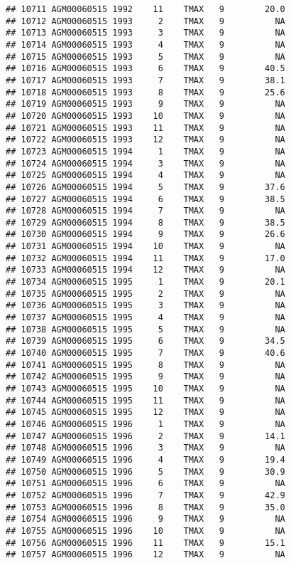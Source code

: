 \documentclass{article}\usepackage[]{graphicx}\usepackage[]{color}
\makeatletter
\newenvironment{kframe}{%
 \def\at@end@of@kframe{}%
 \ifinner\ifhmode%
  \def\at@end@of@kframe{\end{minipage}}%
  \begin{minipage}{\columnwidth}%
 \fi\fi%
 \def\FrameCommand##1{\hskip\@totalleftmargin \hskip-\fboxsep
 \colorbox{shadecolor}{##1}\hskip-\fboxsep
     \hskip-\linewidth \hskip-\@totalleftmargin \hskip\columnwidth}%
 \MakeFramed {\advance\hsize-\width
   \@totalleftmargin\z@ \linewidth\hsize
   \@setminipage}}%
 {\par\unskip\endMakeFramed%
 \at@end@of@kframe}
\newenvironment{knitrout}{}{} %
\makeatother
\begin{document}
\begin{knitrout}
\begin{kframe}
\begin{verbatim}
## 10711 AGM00060515 1992    11    TMAX   9        20.0
## 10712 AGM00060515 1993     2    TMAX   9          NA
## 10713 AGM00060515 1993     3    TMAX   9          NA
## 10714 AGM00060515 1993     4    TMAX   9          NA
## 10715 AGM00060515 1993     5    TMAX   9          NA
## 10716 AGM00060515 1993     6    TMAX   9        40.5
## 10717 AGM00060515 1993     7    TMAX   9        38.1
## 10718 AGM00060515 1993     8    TMAX   9        25.6
## 10719 AGM00060515 1993     9    TMAX   9          NA
## 10720 AGM00060515 1993    10    TMAX   9          NA
## 10721 AGM00060515 1993    11    TMAX   9          NA
## 10722 AGM00060515 1993    12    TMAX   9          NA
## 10723 AGM00060515 1994     1    TMAX   9          NA
## 10724 AGM00060515 1994     3    TMAX   9          NA
## 10725 AGM00060515 1994     4    TMAX   9          NA
## 10726 AGM00060515 1994     5    TMAX   9        37.6
## 10727 AGM00060515 1994     6    TMAX   9        38.5
## 10728 AGM00060515 1994     7    TMAX   9          NA
## 10729 AGM00060515 1994     8    TMAX   9        38.5
## 10730 AGM00060515 1994     9    TMAX   9        26.6
## 10731 AGM00060515 1994    10    TMAX   9          NA
## 10732 AGM00060515 1994    11    TMAX   9        17.0
## 10733 AGM00060515 1994    12    TMAX   9          NA
## 10734 AGM00060515 1995     1    TMAX   9        20.1
## 10735 AGM00060515 1995     2    TMAX   9          NA
## 10736 AGM00060515 1995     3    TMAX   9          NA
## 10737 AGM00060515 1995     4    TMAX   9          NA
## 10738 AGM00060515 1995     5    TMAX   9          NA
## 10739 AGM00060515 1995     6    TMAX   9        34.5
## 10740 AGM00060515 1995     7    TMAX   9        40.6
## 10741 AGM00060515 1995     8    TMAX   9          NA
## 10742 AGM00060515 1995     9    TMAX   9          NA
## 10743 AGM00060515 1995    10    TMAX   9          NA
## 10744 AGM00060515 1995    11    TMAX   9          NA
## 10745 AGM00060515 1995    12    TMAX   9          NA
## 10746 AGM00060515 1996     1    TMAX   9          NA
## 10747 AGM00060515 1996     2    TMAX   9        14.1
## 10748 AGM00060515 1996     3    TMAX   9          NA
## 10749 AGM00060515 1996     4    TMAX   9        19.4
## 10750 AGM00060515 1996     5    TMAX   9        30.9
## 10751 AGM00060515 1996     6    TMAX   9          NA
## 10752 AGM00060515 1996     7    TMAX   9        42.9
## 10753 AGM00060515 1996     8    TMAX   9        35.0
## 10754 AGM00060515 1996     9    TMAX   9          NA
## 10755 AGM00060515 1996    10    TMAX   9          NA
## 10756 AGM00060515 1996    11    TMAX   9        15.1
## 10757 AGM00060515 1996    12    TMAX   9          NA

\end{verbatim}
\end{kframe}
\end{knitrout}
\end{document}

